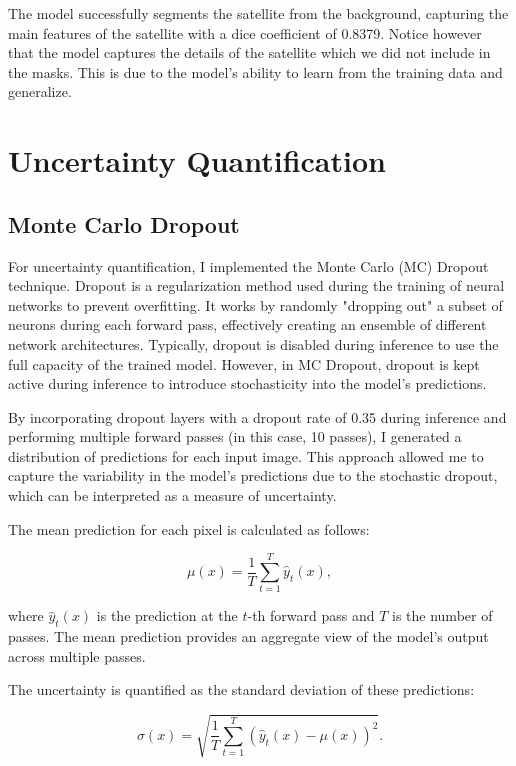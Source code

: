 \documentclass{article}
\begin{document}
The model successfully segments the satellite from the background, capturing the main features of the satellite
with a dice coefficient of 0.8379. Notice however that the model captures the details of the satellite which we 
did not include in the masks. This is due to the model's ability to learn from the training data and generalize.

\section{Uncertainty Quantification}
\subsection{Monte Carlo Dropout}

For uncertainty quantification, I implemented the Monte Carlo (MC) Dropout technique. Dropout is a regularization method 
used during the training of neural networks to prevent overfitting. It works by randomly "dropping out" a subset of neurons 
during each forward pass, effectively creating an ensemble of different network architectures. Typically, dropout is 
disabled during inference to use the full capacity of the trained model. However, in MC Dropout, dropout is kept active 
during inference to introduce stochasticity into the model's predictions.

By incorporating dropout layers with a dropout rate of 0.35 during inference and performing multiple forward passes 
(in this case, 10 passes), I generated a distribution of predictions for each input image. This approach allowed me to 
capture the variability in the model's predictions due to the stochastic dropout, which can be interpreted as a measure of 
uncertainty.

The mean prediction for each pixel is calculated as follows:

\[
\mu(x) = \frac{1}{T} \sum_{t=1}^{T} \hat{y}_t(x),
\]

where \( \hat{y}_t(x) \) is the prediction at the \( t \)-th forward pass and \( T \) is the number of passes. The mean 
prediction provides an aggregate view of the model's output across multiple passes.

The uncertainty is quantified as the standard deviation of these predictions:

\[
\sigma(x) = \sqrt{\frac{1}{T} \sum_{t=1}^{T} (\hat{y}_t(x) - \mu(x))^2}.
\]
\end{document}
